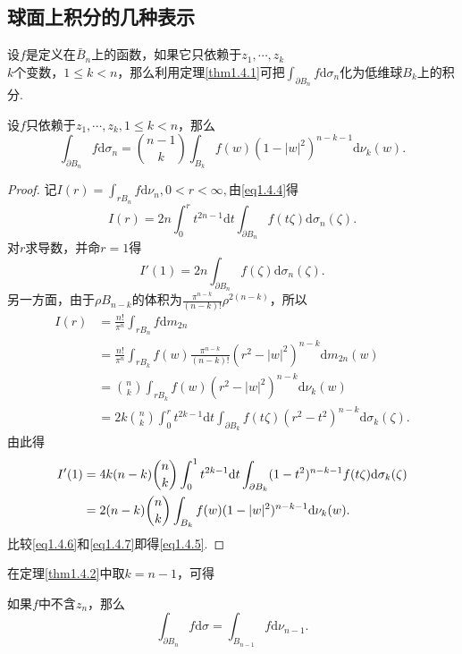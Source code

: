 \subsection{球面上积分的几种表示}
设$f$是定义在$\bar{B}_n$上的函数，如果它只依赖于$z_1,\cdots,z_k$\\$k$个变数，$1\le k< n$，那么利用定理\ref{thm1.4.1}可把$\int_{\partial B_n}f\mathrm{d}\sigma_n$化为低维球$B_k$上的积分.
\begin{theorem}\label{thm1.4.2}
	设$f$只依赖于$z_1,\cdots,z_k,1\le k<n$，那么
	\begin{equation}\label{eq1.4.5}
		\int_{\partial B_n}f\mathrm{d}\sigma_n=\binom{n-1}{k}\int_{B_k}f(w)(1-|w|^2)^{n-k-1}\mathrm{d}\nu_k(w).
	\end{equation}
\end{theorem}
\begin{proof}
	记$I(r)=\int_{rB_n}f\mathrm{d}\nu_n,0<r<\infty,$由\eqref{eq1.4.4}得
	\[I(r)=2n\int_{0}^{r} t^{2n-1}\mathrm{d}t\int_{\partial B_n} f(t\zeta)\mathrm{d}\sigma_n(\zeta).\]
	对$r$求导数，并命$r=1$得
	\begin{equation}\label{eq1.4.6}
		I'(1)=2n\int_{\partial B_n} f(\zeta)\mathrm{d}\sigma_n(\zeta).
	\end{equation}
另一方面，由于$\rho B_{n-k}$的体积为$\frac{\pi^{n-k}}{(n-k)!}\rho^{2(n-k)}$，所以
\begin{align*}
	I(r)
	&=\frac{n!}{\pi^n}\int_{rB_n} f\mathrm{d} m_{2n}\\
	&=\frac{n!}{\pi^n}\int_{rB_k} f(w)\frac{\pi^{n-k}}{(n-k)!}(r^2-|w|^2)^{n-k}\mathrm{d}m_{2n}(w)\\
	&=\binom{n}{k}\int_{rB_k} f(w)(r^2-|w|^2)^{n-k}\mathrm{d}\nu_k(w)\\
	&=2k\binom{n}{k}\int_{0}^{r}t^{2k-1}\mathrm{d}t\int_{\partial B_k}f(t\zeta)(r^2-t^2)^{n-k}\mathrm{d}\sigma_k(\zeta).
\end{align*}
由此得
\begin{align}\label{eq1.4.7}
		I'(1)
	&=4k(n-k)\binom{n}{k}\int_{0}^{1}t^{2k-1}\mathrm{d}t\int_{\partial B_k} (1-t^2)^{n-k-1}f(t\zeta)\mathrm{d}\sigma_k(\zeta)\notag\\
	&=2(n-k)\binom{n}{k}\int_{B_k} f(w)(1-|w|^2)^{n-k-1}\mathrm{d}\nu_k(w).
\end{align}
比较\eqref{eq1.4.6}和\eqref{eq1.4.7}即得\eqref{eq1.4.5}.
\end{proof}
在定理\ref{thm1.4.2}中取$k=n-1$，可得
\begin{corollary}\label{cor1.4.3}
	如果$f$中不含$z_n$，那么
	\[\int_{\partial B_n}f\mathrm{d}\sigma=\int_{B_{n-1}}f\mathrm{d}\nu_{n-1}.\]
\end{corollary}
